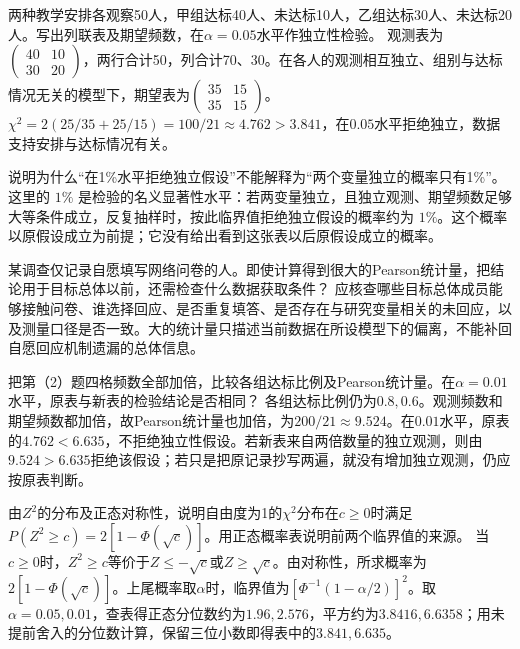 两种教学安排各观察50人，甲组达标40人、未达标10人，乙组达标30人、未达标20人。写出列联表及期望频数，在\(\alpha=0.05\)水平作独立性检验。
\solutionanswer
观测表为\(\left(\begin{smallmatrix}40&10\\30&20\end{smallmatrix}\right)\)，两行合计50，列合计70、30。在各人的观测相互独立、组别与达标情况无关的模型下，期望表为\(\left(\begin{smallmatrix}35&15\\35&15\end{smallmatrix}\right)\)。\(\chi^2=2(25/35+25/15)=100/21\approx4.762>3.841\)，在\(0.05\)水平拒绝独立，数据支持安排与达标情况有关。


说明为什么“在1\%水平拒绝独立假设”不能解释为“两个变量独立的概率只有1\%”。
\solutionanswer
这里的 \(1\%\) 是检验的名义显著性水平：若两变量独立，且独立观测、期望频数足够大等条件成立，反复抽样时，按此临界值拒绝独立假设的概率约为 \(1\%\)。这个概率以原假设成立为前提；它没有给出看到这张表以后原假设成立的概率。


某调查仅记录自愿填写网络问卷的人。即使计算得到很大的Pearson统计量，把结论用于目标总体以前，还需检查什么数据获取条件？
\solutionanswer
应核查哪些目标总体成员能够接触问卷、谁选择回应、是否重复填答、是否存在与研究变量相关的未回应，以及测量口径是否一致。大的统计量只描述当前数据在所设模型下的偏离，不能补回自愿回应机制遗漏的总体信息。


把第（2）题四格频数全部加倍，比较各组达标比例及Pearson统计量。在\(\alpha=0.01\)水平，原表与新表的检验结论是否相同？
\solutionanswer
各组达标比例仍为\(0.8,0.6\)。观测频数和期望频数都加倍，故Pearson统计量也加倍，为\(200/21\approx9.524\)。在\(0.01\)水平，原表的\(4.762<6.635\)，不拒绝独立性假设。若新表来自两倍数量的独立观测，则由\(9.524>6.635\)拒绝该假设；若只是把原记录抄写两遍，就没有增加独立观测，仍应按原表判断。


由\(Z^2\)的分布及正态对称性，说明自由度为1的\(\chi^2\)分布在\(c\ge0\)时满足\(P(Z^2\ge c)=2[1-\Phi(\sqrt c)]\)。用正态概率表说明前两个临界值的来源。
\solutionanswer
当\(c\ge0\)时，\(Z^2\ge c\)等价于\(Z\le-\sqrt c\)或\(Z\ge\sqrt c\)。由对称性，所求概率为\(2[1-\Phi(\sqrt c)]\)。上尾概率取\(\alpha\)时，临界值为\([\Phi^{-1}(1-\alpha/2)]^2\)。取\(\alpha=0.05,0.01\)，查表得正态分位数约为\(1.96,2.576\)，平方约为\(3.8416,6.6358\)；用未提前舍入的分位数计算，保留三位小数即得表中的\(3.841,6.635\)。


